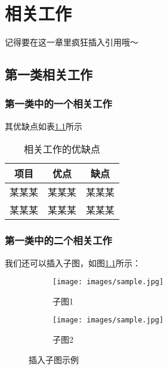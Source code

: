 
\chapter{相关工作}

记得要在这一章里疯狂插入引用\cite{2021模板}哦～

\section{第一类相关工作}

\subsection{第一类中的一个相关工作}

其优缺点如表\ref{tab:相关工作的优缺点}所示

\begin{table}[!htb]
    \begin{center}
        \caption{相关工作的优缺点}
        \label{tab:相关工作的优缺点}
        \small
        \begin{tabular}{c|c|c}
        \toprule
            项目 & 优点 & 缺点\tabularnewline
            \hline 
            某某某 & 某某某 & 某某某\tabularnewline
            \hline 
            某某某 & 某某某 & 某某某\tabularnewline
            \bottomrule
        \end{tabular}
    \end{center}
    
  \end{table}
  

\subsection{第一类中的二个相关工作}

我们还可以插入子图，如图\ref{img:插入子图示例}所示：

\begin{figure}[!htbp]
    \begin{center}
        \begin{subfigure}[b]{0.25\textwidth}
            \centering
            \texttt{[image: images/sample.jpg]}
            \caption{子图1}
        \end{subfigure}
        \begin{subfigure}[b]{0.25\textwidth}
            \centering
            \texttt{[image: images/sample.jpg]}
            \caption{子图2}
        \end{subfigure}
        \caption{插入子图示例}
        \label{img:插入子图示例}
    \end{center}
\end{figure}
\vspace{-1.5em}

